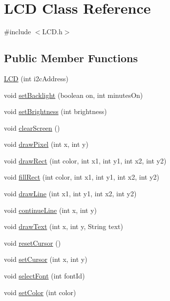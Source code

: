 \hypertarget{class_l_c_d}{
\section{\-L\-C\-D \-Class \-Reference}
\label{class_l_c_d}
}


{\ttfamily \#include $<$\-L\-C\-D.\-h$>$}

\subsection*{\-Public \-Member \-Functions}
\begin{DoxyCompactItemize}
\item 
\hyperlink{class_l_c_d_afb6cbb0ecf8aaad46c060e319af0e724}{\-L\-C\-D} (int i2c\-Address)
\item 
void \hyperlink{class_l_c_d_adf4626c4c493995042cc63148c8805b6}{set\-Backlight} (boolean on, int minutes\-On)
\item 
void \hyperlink{class_l_c_d_a2c0734d6f1830ae19ef4dd05b9d22014}{set\-Brightness} (int brightness)
\item 
void \hyperlink{class_l_c_d_a0bd558c0fd92a46c1929beba3972cd61}{clear\-Screen} ()
\item 
void \hyperlink{class_l_c_d_af73249176c0673f6da9a9278dbb5fbe9}{draw\-Pixel} (int x, int y)
\item 
void \hyperlink{class_l_c_d_ab22ec13ce4607f3c95d7df959f35f97b}{draw\-Rect} (int color, int x1, int y1, int x2, int y2)
\item 
void \hyperlink{class_l_c_d_a2d3e22346053cf96a7f4d6860f6e84b4}{fill\-Rect} (int color, int x1, int y1, int x2, int y2)
\item 
void \hyperlink{class_l_c_d_a144e747bf6dae0ddd1bdb8a6f64919c0}{draw\-Line} (int x1, int y1, int x2, int y2)
\item 
void \hyperlink{class_l_c_d_a48677cbc0e939ba96fa88a43a74e2089}{continue\-Line} (int x, int y)
\item 
void \hyperlink{class_l_c_d_a427c727a5fd5b0964099055924f03568}{draw\-Text} (int x, int y, \-String text)
\item 
void \hyperlink{class_l_c_d_a63588a54f85cd2ec0ca6f385a7a4db75}{reset\-Cursor} ()
\item 
void \hyperlink{class_l_c_d_a16e8115213cdca534e683fb5f45df984}{set\-Cursor} (int x, int y)
\item 
void \hyperlink{class_l_c_d_aa9655bbc96a0b1e15546071dadcaa3cc}{select\-Font} (int font\-Id)
\item 
void \hyperlink{class_l_c_d_afa84a7882c83a7c11f8abf93d00e28a5}{set\-Color} (int color)
\end{DoxyCompactItemize}


